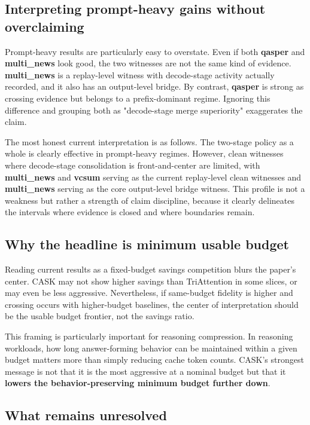 \subsection{Interpreting prompt-heavy gains without overclaiming}


Prompt-heavy results are particularly easy to overstate. Even if both \textbf{qasper} and \textbf{multi\_news} look good, the two witnesses are not the same kind of evidence. \textbf{multi\_news} is a replay-level witness with decode-stage activity actually recorded, and it also has an output-level bridge. By contrast, \textbf{qasper} is strong as crossing evidence but belongs to a prefix-dominant regime. Ignoring this difference and grouping both as "decode-stage merge superiority" exaggerates the claim.


The most honest current interpretation is as follows. The two-stage policy as a whole is clearly effective in prompt-heavy regimes. However, clean witnesses where decode-stage consolidation is front-and-center are limited, with \textbf{multi\_news} and \textbf{vcsum} serving as the current replay-level clean witnesses and \textbf{multi\_news} serving as the core output-level bridge witness. This profile is not a weakness but rather a strength of claim discipline, because it clearly delineates the intervals where evidence is closed and where boundaries remain.


\subsection{Why the headline is minimum usable budget}


Reading current results as a fixed-budget savings competition blurs the paper's center. CASK may not show higher savings than TriAttention in some slices, or may even be less aggressive. Nevertheless, if same-budget fidelity is higher and crossing occurs with higher-budget baselines, the center of interpretation should be the usable budget frontier, not the savings ratio.


This framing is particularly important for reasoning compression. In reasoning workloads, how long answer-forming behavior can be maintained within a given budget matters more than simply reducing cache token counts. CASK's strongest message is not that it is the most aggressive at a nominal budget but that it \textbf{lowers the behavior-preserving minimum budget further down}.


\subsection{What remains unresolved}


